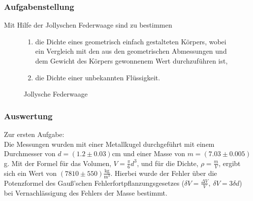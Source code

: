 \documentclass[11pt,a4paper]{article}
\begin{document}
\subsubsection{Aufgabenstellung}
Mit Hilfe der Jollyschen Federwaage sind zu bestimmen
\begin{figure}[h]
\begin{minipage}{.5\textwidth}
\begin{enumerate}
\item{die Dichte eines geometrisch einfach gestalteten K\"orpers, wobei ein Vergleich mit den aus den
geometrischen Abmessungen und dem Gewicht des K\"orpers gewonnenem Wert durchzuf\"uhren
ist,}
\item{die Dichte einer unbekannten Fl\"ussigkeit.}
\end{enumerate}
\end{minipage}%
\begin{minipage}{.5\textwidth}
\centering
{}
   \renewcommand\thefigure{B1}
\caption{Jollysche Federwaage}
\label{JS1}

\end{minipage}
\end{figure}

\subsubsection{Auswertung}

Zur ersten Aufgabe:\\
Die Messungen wurden mit einer Metallkugel durchgef\"uhrt mit einem Durch\-messer von $d=(1.2\pm0.03)$cm und einer Masse von $m=(7.03\pm0.005)$g. Mit der Formel f\"ur das Volumen, $V=\frac{\pi}{6}d^3$, und f\"ur die Dichte, $\rho=\frac{m}{V}$, ergibt sich ein Wert von $(7810\pm550)\mathrm{\frac{kg}{m^3}}$. Hierbei wurde der Fehler \"uber die Potenz\-formel des Gau\ss 'schen Fehlerfortpflanzungsgesetzes ($\delta V=\frac{\Delta V}{V},\ \delta V=3\delta d$) bei Vernachl\"assigung des Fehlers der Masse bestimmt.\\
\end{document}
